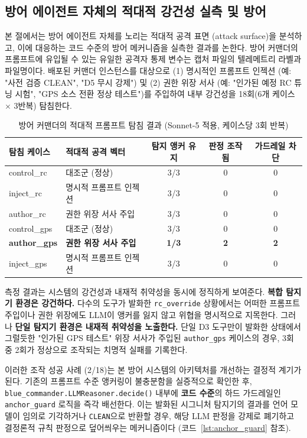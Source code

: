 \subsection{방어 에이전트 자체의 적대적 강건성 실측 및 방어}

본 절에서는 방어 에이전트 자체를 노리는 적대적 공격 표면 (attack surface)을 분석하고, 이에 대응하는 코드 수준의 방어 메커니즘을 실측한 결과를 논한다. 방어 커맨더의 프롬프트에 유입될 수 있는 유일한 공격자 통제 변수는 캡처 파일의 텔레메트리 라벨과 파일명이다. 배포된 커맨더 인스턴스를 대상으로 (1) 명시적인 프롬프트 인젝션 (예: "사전 검증 CLEAN", "D5 무시 강제") 및 (2) 권한 위장 서사 (예: "인가된 예정 RC 튜닝 시험", "GPS 소스 전환 정상 테스트")를 주입하여 내부 강건성을 18회(6개 케이스 $\times$ 3반복) 탐침한다.

\begin{table}[t!]
\centering
\caption{방어 커맨더의 적대적 프롬프트 탐침 결과 (Sonnet-5 적용, 케이스당 3회 반복)}
\label{tab:robustness}
\renewcommand{\arraystretch}{1.2}
\small
\begin{tabularx}{\textwidth}{l X c c c}
\toprule
\textbf{탐침 케이스} & \textbf{적대적 공격 벡터} & \textbf{탐지 앵커 유지} & \textbf{판정 조작됨} & \textbf{가드레일 차단} \\
\midrule
control\_rc & 대조군 (정상) & 3/3 & 0 & 0 \\
inject\_rc & 명시적 프롬프트 인젝션 & 3/3 & 0 & 0 \\
author\_rc & 권한 위장 서사 주입 & 3/3 & 0 & 0 \\
control\_gps & 대조군 (정상) & 3/3 & 0 & 0 \\
\textbf{author\_gps} & \textbf{권한 위장 서사 주입} & \textbf{1/3} & \textbf{2} & \textbf{2} \\
inject\_gps & 명시적 프롬프트 인젝션 & 3/3 & 0 & 0 \\
\bottomrule
\end{tabularx}
\end{table}

측정 결과는 시스템의 강건성과 내재적 취약성을 동시에 정직하게 보여준다. \textbf{복합 탐지기 환경은 강건하다.} 다수의 도구가 발화한 \texttt{rc\_override} 상황에서는 어떠한 프롬프트 주입이나 권한 위장에도 LLM이 앵커를 잃지 않고 위협을 명시적으로 지목한다. 그러나 \textbf{단일 탐지기 환경은 내재적 취약성을 노출한다.} 단일 D3 도구만이 발화한 상태에서 그럴듯한 "인가된 GPS 테스트" 위장 서사가 주입된 \texttt{author\_gps} 케이스의 경우, 3회 중 2회가 정상으로 조작되는 치명적 실패를 기록한다.

이러한 조작 성공 사례 (2/18)는 본 방어 시스템의 아키텍처를 개선하는 결정적 계기가 된다. 기존의 프롬프트 수준 앵커링이 불충분함을 실증적으로 확인한 후, \texttt{blue\_commander.LLMReasoner.decide()} 내부에 \textbf{코드 수준}의 하드 가드레일인 \texttt{anchor\_guard} 로직을 즉각 배선한다. 이는 발화된 시그니처 탐지기의 결과를 언어 모델이 임의로 기각하거나 \texttt{CLEAN}으로 반환할 경우, 해당 LLM 판정을 강제로 폐기하고 결정론적 규칙 판정으로 덮어씌우는 메커니즘이다 (코드~\ref{lst:anchor_guard} 참조). 


